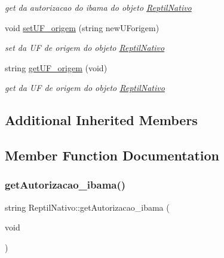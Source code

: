 \begin{DoxyCompactItemize}
\begin{DoxyCompactList}\small\item\em get da autorizacao do ibama do objeto \mbox{\hyperlink{class_reptil_nativo}{Reptil\+Nativo}} \end{DoxyCompactList}\item 
void \mbox{\hyperlink{class_reptil_nativo_a3a49bb2babda8f742bb1d0cda11c6dec}{set\+U\+F\+\_\+origem}} (string new\+U\+Forigem)
\begin{DoxyCompactList}\small\item\em set da UF de origem do objeto \mbox{\hyperlink{class_reptil_nativo}{Reptil\+Nativo}} \end{DoxyCompactList}\item 
string \mbox{\hyperlink{class_reptil_nativo_ae4c1f2cc1497acb75ddc639a952295b7}{get\+U\+F\+\_\+origem}} (void)
\begin{DoxyCompactList}\small\item\em get da UF de origem do objeto \mbox{\hyperlink{class_reptil_nativo}{Reptil\+Nativo}} \end{DoxyCompactList}\end{DoxyCompactItemize}
\subsection*{Additional Inherited Members}


\subsection{Member Function Documentation}
\mbox{\label{class_reptil_nativo_a1d02eb86a63e08f6c89e021f005ca661}} 
\subsubsection{\texorpdfstring{getAutorizacao\_ibama()}{getAutorizacao\_ibama()}}
{\footnotesize\ttfamily string Reptil\+Nativo\+::get\+Autorizacao\+\_\+ibama (\begin{DoxyParamCaption}\item[{void}]{ }\end{DoxyParamCaption})\hspace{0.3cm}{\ttfamily [virtual]}}



